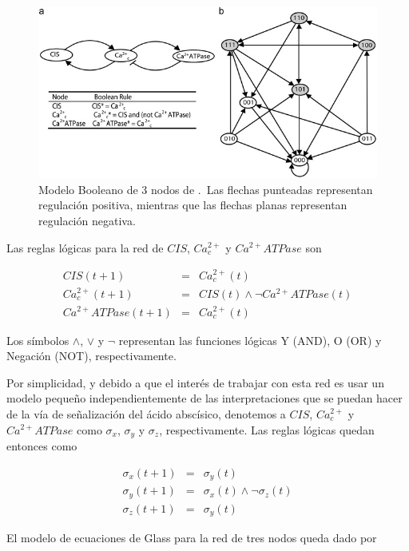 \begin{figure}[hbt]
\includegraphics[width=0.9\linewidth]{gfx/red3nodos}
\caption[Modelo Booleano de 3 nodos]{Modelo Booleano de 3 nodos de \citeauthor{Reka3Nodos2010} \citep{Reka3Nodos2010}.\ Las flechas punteadas representan regulación positiva, mientras que las flechas planas representan regulación negativa.}\label{fig:red3reka}
\end{figure}

Las reglas lógicas para la red de $CIS$, $Ca^{2+}_c$ y $Ca^{2+}ATPase$ son

\begin{eqnarray}
   	CIS(t+1) & = & Ca^{2+}_c(t) \\ 
    Ca^{2+}_c(t+1) & = & CIS(t) \wedge \neg Ca^{2+}ATPase(t) \\ 
    Ca^{2+}ATPase(t+1) & = & Ca^{2+}_c(t)
\end{eqnarray}

Los símbolos $\land$, $\lor$ y $\neg$ representan las funciones lógicas Y (AND), O (OR) y Negación (NOT), respectivamente.

Por simplicidad, y debido a que el interés de trabajar con esta red es usar un modelo pequeño independientemente de las interpretaciones que se puedan hacer de la vía de señalización del ácido abscísico, denotemos a $CIS$, $Ca^{2+}_c$ y $Ca^{2+}ATPase$ como $\sigma_x$, $\sigma_y$ y $\sigma_z$, respectivamente. Las reglas lógicas quedan entonces como

\begin{eqnarray}
	\sigma_x(t+1) & = & \sigma_y(t) \\ 
    \sigma_y(t+1) & = & \sigma_x(t) \wedge \neg \sigma_z(t) \\ 
    \sigma_z(t+1) & = & \sigma_y(t)
\end{eqnarray}

El modelo de ecuaciones de Glass para la red de tres nodos queda dado por

